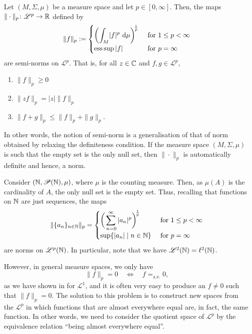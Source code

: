 \begin{proposition}
Let $(M,\Sigma,\mu)$ be a measure space and let $p\in[0,\infty]$. Then, the maps $\|\cdot\|_p\colon \mathscr{L}^p\to\mathbb{R}$ defined by
\begin{equation*}
\|f\|_p:=
\begin{cases}
\biggl(\displaystyle\int_M\! |f|^p\,\mathop{}\!\mathrm{d} \mu\biggr)^{\negmedspace\frac{1}{p}} & \text{ for } 1\leq p<\infty\\
\operatorname*{ess\,sup} |f| & \text{ for }p=\infty
\end{cases}
\end{equation*}
are semi-norms on $\mathscr{L}^p$. That is, for all $z\in \mathbb{C}$ and $f,g\in\mathscr{L}^p$,
\begin{enumerate}[label=(\roman*)]
\item $\|f\|_p\geq 0$
\item $\|z f\|_p = |z|\|f\|_p$
\item $\|f+g\|_p\leq\|f\|_p+\|g\|_p$.
\end{enumerate}
\end{proposition}
In other words, the notion of semi-norm is a generalisation of that of norm obtained by relaxing the definiteness condition. If the measure space $(M,\Sigma,\mu)$ is such that the empty set is the only null set, then $\|\cdot\|_p$ is automatically definite and hence, a norm.

\begin{example}
Consider $(\mathbb{N},\mathscr{P}(\mathbb{N}),\mu)$, where $\mu$ is the counting measure. Then, as $\mu(A)$ is the cardinality of $A$, the only null set is the empty set. Thus, recalling that functions on $\mathbb{N}$ are just sequences, the maps
\begin{equation*}
\|\{a_n\}_{n\in\mathbb{N}}\|_p = 
\begin{cases}
\biggl(\displaystyle\sum_{\,n=0}^{\infty} |a_n|^p\biggr)^{\negmedspace\frac{1}{p}} & \text{ for } 1\leq p<\infty\\
\sup \{|a_n| \mid n\in \mathbb{N}\} & \text{ for }p=\infty
\end{cases}
\end{equation*}
are norms on $\mathscr{L}^p(\mathbb{N})$. In particular, note that we have $\mathscr{L}^2(\mathbb{N})=\ell^2(\mathbb{N})$.
\end{example}


However, in general measure spaces, we only have
\begin{equation*}
\|f\|_p = 0 \quad \Leftrightarrow \quad f =_{\mathrm{a.e.}} 0,
\end{equation*}
as we have shown in  for $\mathscr{L}^1$, and it is often very easy to produce an $f\neq 0$ such that $\|f\|_p=0$. The solution to this problem is to construct new spaces from the $\mathscr{L}^p$ in which functions that are almost everywhere equal are, in fact, the same function. In other words, we need to consider the quotient space of $\mathscr{L}^p$ by the equivalence relation ``being almost everywhere equal''.

